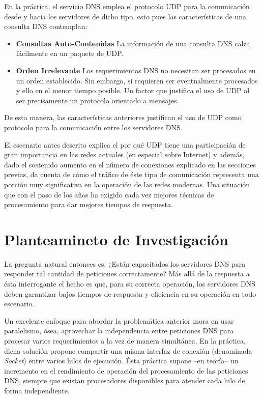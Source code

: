 \begin{intro}
En la práctica, el servicio DNS emplea el protocolo UDP para la comunicación desde y hacia los servidores de dicho tipo, esto pues las características de una consulta DNS contemplan:

\begin{itemize}
\item \textbf{Consultas Auto-Contenidas} La información de una consulta DNS calza fácilmente en un paquete de UDP.
\item \textbf{Orden Irrelevante} Los requerimientos DNS no necesitan ser procesados en un orden establecido. Sin embargo, si requieren ser eventualmente procesados y ello en el menor tiempo posible. Un factor que justifica el uso de UDP al ser precisamente un protocolo orientado a mensajes.
\end{itemize}

De esta manera, las características anteriores justifican el uso de UDP como protocolo para la comunicación entre los servidores DNS.

El escenario antes descrito explica el por qué UDP tiene una participación de gran importancia en las redes actuales (en especial sobre Internet) y además, dado el sostenido aumento en el número de conexiones explicado en las secciones previas, da cuenta de cómo el tráfico de éste tipo de comunicación representa una porción muy significativa en la operación de las redes modernas. Una situación que con el paso de los años ha exigido cada vez mejores técnicas de procesamiento para dar mejores tiempos de respuesta.

\section*{Planteamineto de Investigación}

La pregunta natural entonces es: ¿Están capacitados los servidores DNS para responder tal cantidad de peticiones correctamente? Más allá de la respuesta a ésta interrogante el hecho es que, para su correcta operación, los servidores DNS deben garantizar bajos tiempos de respuesta y eficiencia en su operación en todo escenario.

Un excelente enfoque para abordar la problemática anterior mora en usar paralelismo, ósea, aprovechar la independencia entre peticiones DNS para procesar varios requerimientos a la vez de manera simultánea. En la práctica, dicha solución propone compartir una misma interfaz de conexión (denominada \emph{Socket}) entre varios hilos de ejecución. Ésta práctica supone --en teoría-- un incremento en el rendimiento de operación del procesamiento de las peticiones DNS, siempre que existan procesadores disponibles para atender cada hilo de forma independiente.


\end{intro}
